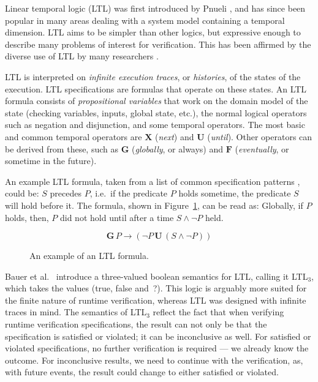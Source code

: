 Linear temporal logic (LTL) was first introduced by Pnueli \cite{pnueli77}, and
has since been popular in many areas dealing with a system model containing a
temporal dimension. LTL aims to be simpler than other logics, but expressive
enough to describe many problems of interest for verification. This has been
affirmed by the diverse use of LTL by many researchers \cite{pnueli77}.

LTL is interpreted on \textit{infinite execution traces}, or
\textit{histories}, of the states of the execution. LTL specifications are
formulas that operate on these states. An LTL formula consists of
\textit{propositional variables} that work on the domain model of the state
(checking variables, inputs, global state, etc.), the normal logical operators
such as negation and disjunction, and some temporal operators. The most basic
and common temporal operators are $\boldsymbol{X}$ (\textit{next}) and
$\boldsymbol{U}$ (\textit{until}). Other operators can be derived from these,
such as $\boldsymbol{G}$ (\textit{globally}, or always) and $\boldsymbol{F}$
(\textit{eventually}, or sometime in the future).

An example LTL formula, taken from a list of common specification patterns
\cite{dwyer99patterns}, could be: $S$ precedes $P$, i.e.\ if the predicate $P$
holds sometime, the predicate $S$ will hold before it. The formula, shown in
Figure~\ref{figure-ltl}, can be read as: Globally, if $P$ holds, then, $P$ did
not hold until after a time $S \wedge \neg P$ held.

\begin{figure}[h!]
	\[
	\boldsymbol{G} \, P \rightarrow (\neg P \, \boldsymbol{U} \, (S \wedge \neg P))
	\]

	\caption{An example of an LTL formula. }
	\label{figure-ltl}
\end{figure}

Bauer et al.\ \cite{bauer06monitoring} introduce a three-valued boolean
semantics for LTL, calling it LTL$_3$, which takes the values (true, false
and~?). This logic is arguably more suited for the finite nature of runtime
verification, whereas LTL was designed with infinite traces in mind. The
semantics of LTL$_3$ reflect the fact that when verifying runtime verification
specifications, the result can not only be that the specification is satisfied
or violated; it can be inconclusive as well. For satisfied or violated
specifications, no further verification is required --- we already know the
outcome. For inconclusive results, we need to continue with the verification,
as, with future events, the result could change to either satisfied or
violated.

